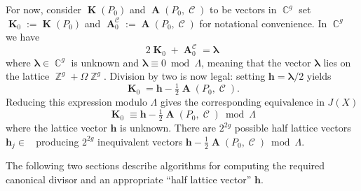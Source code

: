 \documentclass[12pt]{article}
\theoremstyle{definition}
\DeclareMathOperator{\ZZ}{\mathbb{Z}}
\DeclareMathOperator{\CC}{\mathbb{C}}
\DeclareMathOperator{\DivC}{\mathcal{C}}
\DeclareMathOperator{\RCV}{\boldsymbol{K}}
\DeclareMathOperator{\Abel}{\boldsymbol{A}}
\DeclareMathOperator{\HalfLattice}{\Lambda_{1/2}}
\begin{document}
For now, consider $\RCV(P_0)$ and $\Abel(P_0,\DivC)$ to be vectors in
$\CC^g$ set $\RCV_0 := \RCV(P_0)$ and $\Abel_0^{\DivC} :=
\Abel(P_0,\DivC)$ for notational convenience. In $\CC^g$ we have
\[
2\RCV_0 + \Abel_0^{\DivC} = \boldsymbol{\lambda}
\]
where $\boldsymbol{\lambda} \in \CC^g$ is unknown and
$\boldsymbol{\lambda} \equiv 0 \bmod{\Lambda}$, meaning that the vector
$\boldsymbol{\lambda}$ lies on the lattice $\ZZ^g + \Omega
\ZZ^g$. Division by two is now legal: setting $\boldsymbol{h} =
\boldsymbol{\lambda}/2$ yields
\[
\RCV_0 = \boldsymbol{h} - \tfrac{1}{2} \Abel(P_0,\DivC).
\]
Reducing this expression modulo $\Lambda$ gives the corresponding
equivalence in $J(X)$
\[
\RCV_0 \equiv \boldsymbol{h} - \tfrac{1}{2} \Abel(P_0,\DivC)
\bmod{\Lambda}
\]
where the lattice vector $\boldsymbol{h}$ is unknown. There are $2^{2g}$
possible half lattice vectors $\boldsymbol{h}_j \in \HalfLattice$
producing $2^{2g}$ inequivalent vectors $\boldsymbol{h} -
{\textstyle\tfrac{1}{2}}\Abel(P_0,\DivC) \bmod{\Lambda}$.

The following two sections describe algorithms for computing the
required canonical divisor and an appropriate ``half lattice vector''
$\boldsymbol{h}$.

\end{document}
